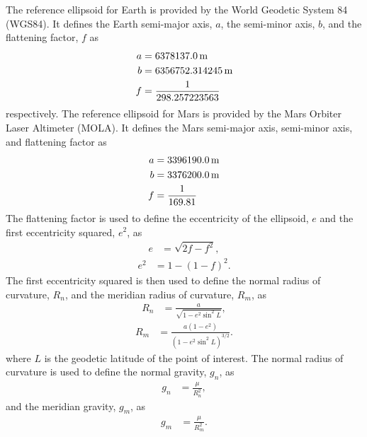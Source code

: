 \documentclass[12pt]{article}
\numberwithin{equation}{section}
\numberwithin{figure}{section}
\numberwithin{table}{section}
\begin{document}
The reference ellipsoid for Earth is provided by the World Geodetic System 84 (WGS84). It defines the Earth semi-major axis, $a$, the semi-minor axis, $b$, and the flattening factor, $f$ as
\begin{gather*}
    \setlength\jot{-2ex}
    \begin{aligned}
        a &= 6378137.0\,\text{m} \\
        b &= 6356752.314245\,\text{m} \\
        f &= \frac{1}{298.257223563}
    \end{aligned}
\end{gather*}
respectively. The reference ellipsoid for Mars is provided by the Mars Orbiter Laser Altimeter (MOLA). It defines the Mars semi-major axis, semi-minor axis, and flattening factor as
\begin{gather*}
    \setlength\jot{-2ex}
    \begin{aligned}
        a &= 3396190.0\,\text{m} \\
        b &= 3376200.0\,\text{m} \\
        f &= \frac{1}{169.81}
    \end{aligned}
\end{gather*}
The flattening factor is used to define the eccentricity of the ellipsoid, $e$ and the first eccentricity squared, $e^2$, as
\begin{align}
    e &= \sqrt{2f - f^2},
\end{align}
\begin{align}
    e^2 &= 1 - {(1 - f)}^2.
\end{align}
The first eccentricity squared is then used to define the normal radius of curvature, $R_n$, and the meridian radius of curvature, $R_m$, as
\begin{align}
    R_n &= \frac{a}{\sqrt{1 - e^2\sin^2L}},
\end{align}
\begin{align}
    R_m &= \frac{a(1 - e^2)}{{(1 - e^2\sin^2L)}^{3/2}}.
\end{align}
where $L$ is the geodetic latitude of the point of interest.
The normal radius of curvature is used to define the normal gravity, $g_n$, as
\begin{align}
    g_n &= \frac{\mu}{R_n^2},
\end{align}
and the meridian gravity, $g_m$, as
\begin{align}
    g_m &= \frac{\mu}{R_m^2}.
\end{align}
\end{document}
